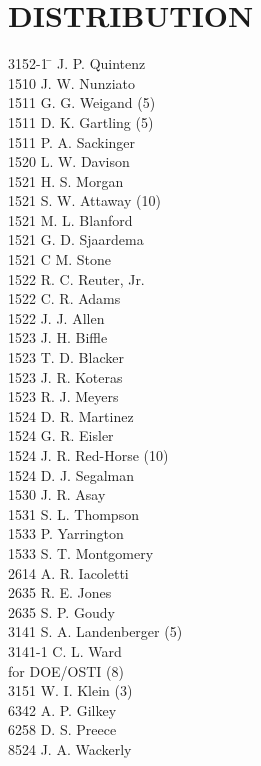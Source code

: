 \twocolumn
\chapter*{DISTRIBUTION}
\begin{tabbing}
3152-1 \=    \> J. P. Quintenz\\
1510   \> J. W. Nunziato\\
1511   \> G. G. Weigand (5)\\
1511   \> D. K. Gartling (5)\\
1511   \> P. A. Sackinger\\
1520   \> L. W. Davison\\
1521   \> H. S. Morgan\\
1521   \> S. W. Attaway (10)\\
1521   \> M. L. Blanford\\
1521   \> G. D. Sjaardema\\
1521   \> C  M. Stone\\
1522   \> R. C. Reuter, Jr.\\
1522   \> C. R. Adams\\
1522   \> J. J. Allen\\
1523   \> J. H. Biffle\\
1523   \> T. D. Blacker\\
1523   \> J. R. Koteras\\
1523   \> R. J. Meyers\\
1524   \> D. R. Martinez\\
1524   \> G. R. Eisler\\
1524   \> J. R. Red-Horse (10)\\
1524   \> D. J. Segalman\\
1530   \> J. R. Asay\\
1531   \> S. L. Thompson\\
1533   \> P. Yarrington\\
1533   \> S. T. Montgomery\\
2614   \> A. R. Iacoletti\\
2635   \> R. E. Jones\\
2635   \> S. P. Goudy\\
3141   \> S. A. Landenberger (5)\\
3141-1 \> C. L. Ward \\
       \> for DOE/OSTI (8) \\
3151   \> W. I. Klein (3)\\
6342   \> A. P. Gilkey\\
6258   \> D. S. Preece\\
8524   \> J. A. Wackerly \\
\end{tabbing}
